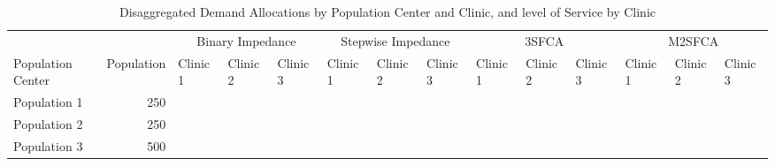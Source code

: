 \documentclass[10pt,letterpaper]{article}
\begin{document}
\begin{landscape}\begin{table}[t]

\caption{\label{tab:table-simulation-demand}\label{tab:table-simulation-demand}Disaggregated Demand Allocations by Population Center and Clinic, and level of Service by Clinic}
\centering
\fontsize{7}{9}\selectfont
\begin{tabular}{lrllllllllllll}
\toprule
\multicolumn{2}{c}{ } & \multicolumn{3}{c}{Binary Impedance} & \multicolumn{3}{c}{Stepwise Impedance} & \multicolumn{3}{c}{3SFCA} & \multicolumn{3}{c}{M2SFCA} \\
\cmidrule(l{3pt}r{3pt}){3-5} \cmidrule(l{3pt}r{3pt}){6-8} \cmidrule(l{3pt}r{3pt}){9-11} \cmidrule(l{3pt}r{3pt}){12-14}
Population Center & Population & Clinic 1 & Clinic 2 & Clinic 3 & Clinic 1 & Clinic 2 & Clinic 3 & Clinic 1 & Clinic 2 & Clinic 3 & Clinic 1 & Clinic 2 & Clinic 3\\
\midrule
Population 1 & 250 & \cellcolor[HTML]{0D0887}{\textcolor{black}{250}} & \cellcolor[HTML]{FCA636}{\textcolor{black}{0}} & \cellcolor[HTML]{FCA636}{\textcolor{black}{0}} & \cellcolor[HTML]{E26561}{\textcolor{black}{60.5}} & \cellcolor[HTML]{FCA636}{\textcolor{black}{0}} & \cellcolor[HTML]{FCA636}{\textcolor{black}{0}} & \cellcolor[HTML]{E26561}{\textcolor{black}{60.5}} & \cellcolor[HTML]{FCA636}{\textcolor{black}{0}} & \cellcolor[HTML]{FCA636}{\textcolor{black}{0}} & \cellcolor[HTML]{E26561}{\textcolor{black}{60.5}} & \cellcolor[HTML]{FCA636}{\textcolor{black}{0}} & \cellcolor[HTML]{FCA636}{\textcolor{black}{0}}\\
Population 2 & 250 & \cellcolor[HTML]{0D0887}{\textcolor{black}{250}} & \cellcolor[HTML]{0D0887}{\textcolor{black}{250}} & \cellcolor[HTML]{FCA636}{\textcolor{black}{0}} & \cellcolor[HTML]{9714A1}{\textcolor{black}{150}} & \cellcolor[HTML]{E26561}{\textcolor{black}{60.5}} & \cellcolor[HTML]{FCA636}{\textcolor{black}{0}} & \cellcolor[HTML]{C13B82}{\textcolor{black}{106.89}} & \cellcolor[HTML]{F79242}{\textcolor{black}{17.388}} & \cellcolor[HTML]{FCA636}{\textcolor{black}{0}} & \cellcolor[HTML]{9714A1}{\textcolor{black}{150}} & \cellcolor[HTML]{E26561}{\textcolor{black}{60.5}} & \cellcolor[HTML]{FCA636}{\textcolor{black}{0}}\\
Population 3 & 500 & \cellcolor[HTML]{0D0887}{\textcolor{black}{500}} & \cellcolor[HTML]{0D0887}{\textcolor{black}{500}} & \cellcolor[HTML]{0D0887}{\textcolor{black}{500}} & \cellcolor[HTML]{E87059}{\textcolor{black}{121}} & \cellcolor[HTML]{9D189D}{\textcolor{black}{300}} & \cellcolor[HTML]{E87059}{\textcolor{black}{121}} & \cellcolor[HTML]{FCA636}{\textcolor{black}{27.013}} & \cellcolor[HTML]{DA5A6A}{\textcolor{black}{166.05}} & \cellcolor[HTML]{FCA636}{\textcolor{black}{27.013}} & \cellcolor[HTML]{E87059}{\textcolor{black}{121}} & \cellcolor[HTML]{9D189D}{\textcolor{black}{300}} & \cellcolor[HTML]{E87059}{\textcolor{black}{121}}\\

\end{tabular}
\end{table}
\end{landscape}
\end{document}
